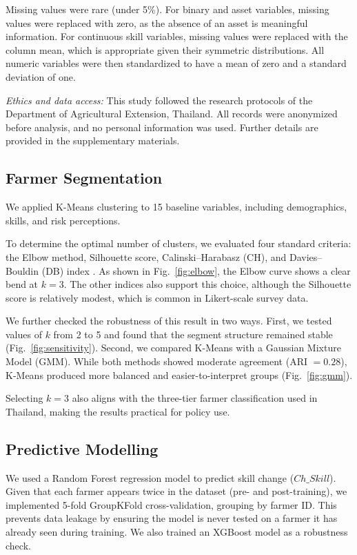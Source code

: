 \documentclass[fleqn,10pt,lineno]{wlpeerj}
\begin{document}
Missing values were rare (under 5\%). For binary and asset variables, missing values were replaced with zero, as the absence of an asset is meaningful information. For continuous skill variables, missing values were replaced with the column mean, which is appropriate given their symmetric distributions. All numeric variables were then standardized to have a mean of zero and a standard deviation of one. 

\textit{Ethics and data access:} This study followed the research protocols of the Department of Agricultural Extension, Thailand. All records were anonymized before analysis, and no personal information was used. Further details are provided in the supplementary materials.

\subsection{Farmer Segmentation}

We applied K-Means clustering \citep{macqueen1967} to 15 baseline variables, including demographics, skills, and risk perceptions.

To determine the optimal number of clusters, we evaluated four standard criteria: the Elbow method, Silhouette score, Calinski--Harabasz (CH), and Davies--Bouldin (DB) index \citep{rouseeuw1987}. As shown in Fig.~\ref{fig:elbow}, the Elbow curve shows a clear bend at $k = 3$. The other indices also support this choice, although the Silhouette score is relatively modest, which is common in Likert-scale survey data.

We further checked the robustness of this result in two ways. First, we tested values of $k$ from 2 to 5 and found that the segment structure remained stable (Fig.~\ref{fig:sensitivity}). Second, we compared K-Means with a Gaussian Mixture Model (GMM). While both methods showed moderate agreement (ARI $= 0.28$), K-Means produced more balanced and easier-to-interpret groups (Fig.~\ref{fig:gmm}).

Selecting $k = 3$ also aligns with the three-tier farmer classification used in Thailand, making the results practical for policy use.

\subsection{Predictive Modelling}
We used a Random Forest regression model \citep{breiman2001} to predict skill change ($Ch\_Skill$). Given that each farmer appears twice in the dataset (pre- and post-training), we implemented 5-fold GroupKFold cross-validation, grouping by farmer ID. This prevents data leakage by ensuring the model is never tested on a farmer it has already seen during training. We also trained an XGBoost model \citep{chen2016} as a robustness check.
\end{document}
